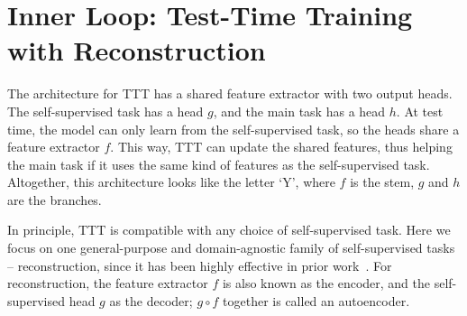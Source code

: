\documentclass{article} %
\begin{document}
\section{Inner Loop: Test-Time Training with Reconstruction}
\label{sec:background}
The architecture for TTT has a shared feature extractor with two output heads.
The self-supervised task has a head $g$, and the main task has a head $h$.
At test time, the model can only learn from the self-supervised task, so the heads share a feature extractor $f$. This way, TTT can update the shared features, thus helping the main task if it uses the same kind of features as the self-supervised task.
Altogether, this architecture looks like the letter `Y', where $f$ is the stem, $g$ and $h$ are the branches. 

In principle, TTT is compatible with any choice of self-supervised task.
Here we focus on one general-purpose and domain-agnostic family of self-supervised tasks -- reconstruction, since it has been highly effective in prior work~\citep{denoisingautoencoder, pathak2016context, brown2020language, beit, mae}. 
For reconstruction, the feature extractor $f$ is also known as the encoder, and the self-supervised head $g$ as the decoder; $g\circ f$ together is called an autoencoder.
\end{document}
